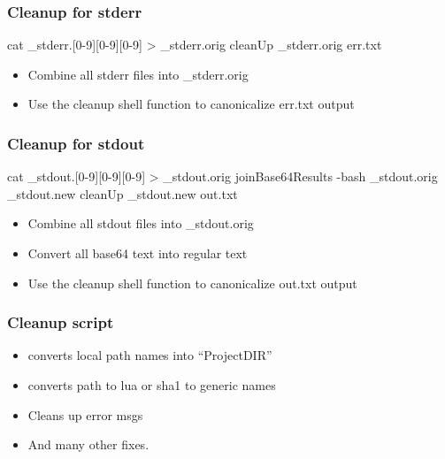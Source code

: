 \documentclass{beamer}
\begin{document}
\begin{frame}[fragile]
  \frametitle{Cleanup for stderr}
    {\tiny
\begin{semiverbatim}
     cat \_stderr.[0-9][0-9][0-9] > \_stderr.orig
     cleanUp \_stderr.orig err.txt
\end{semiverbatim}
    }
    \begin{itemize}
      \item Combine all stderr files into \_stderr.orig
      \item Use the cleanup shell function to canonicalize err.txt output
    \end{itemize}
\end{frame}

\begin{frame}[fragile]
  \frametitle{Cleanup for stdout}
    {\tiny
\begin{semiverbatim}
     cat \_stdout.[0-9][0-9][0-9] > \_stdout.orig
     joinBase64Results  -bash  \_stdout.orig \_stdout.new
     cleanUp \_stdout.new out.txt
\end{semiverbatim}
    }
    \begin{itemize}
      \item Combine all stdout files into \_stdout.orig
      \item Convert all base64 text into regular text
      \item Use the cleanup shell function to canonicalize out.txt output
    \end{itemize}
\end{frame}

\begin{frame}[fragile]
  \frametitle{Cleanup script}
    {\small
\begin{semiverbatim}
\end{semiverbatim}
    }
    \begin{itemize}
      \item converts local path names into ``ProjectDIR''
      \item converts path to lua or sha1 to generic names
      \item Cleans up error msgs 
      \item And many other fixes.
    \end{itemize}
\end{frame}
\end{document}
